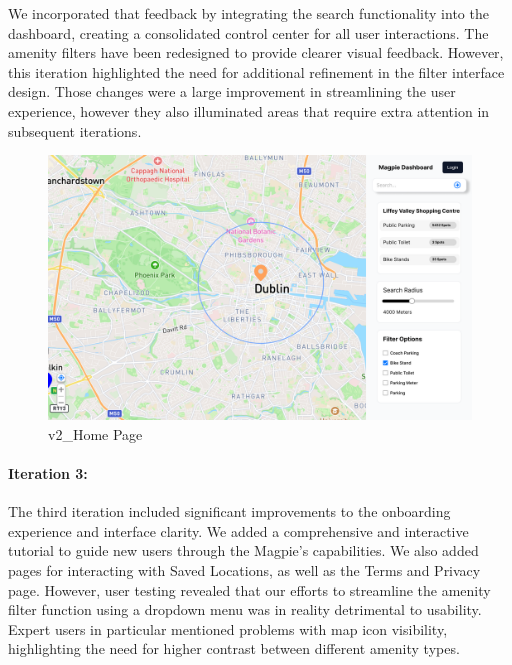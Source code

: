 We incorporated that feedback by integrating the search functionality into the
dashboard, creating a consolidated control center for all user interactions. 
The amenity filters have been redesigned to provide clearer visual feedback. 
However, this iteration highlighted the need for additional refinement in the 
filter interface design. Those changes were a large improvement in streamlining 
the user experience, however they also illuminated areas that require extra 
attention in subsequent iterations.

\begin{figure}[htbp]
    \centering
    \begin{minipage}{0.48\textwidth}
        \centering
        \includegraphics[width=\textwidth]{images/v2_Home Page.png}
        \caption{v2\_Home Page}
        \label{fig:v2_Home Page}
    \end{minipage}
\end{figure}

\newpage{}

\paragraph{Iteration 3:}
The third iteration included significant improvements to the onboarding experience 
and interface clarity. We added a comprehensive and interactive tutorial to guide 
new users through the Magpie's capabilities. We also added pages for interacting 
with Saved Locations, as well as the Terms and Privacy page. However, user testing 
revealed that our efforts to streamline the amenity filter function using a dropdown 
menu was in reality detrimental to usability. Expert users in particular mentioned 
problems with map icon visibility, highlighting the need for higher contrast between 
different amenity types.


